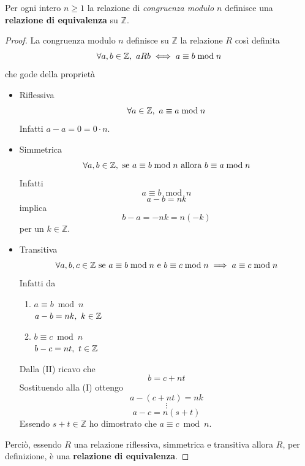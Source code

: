 \documentclass[a4paper,12pt, oneside]{book}
\begin{document}
\begin{teorema}
	Per ogni intero $n \geq 1$ la relazione di \textit{congruenza modulo $n$} definisce una \textbf{relazione di equivalenza} su $\mathbb{Z}$.

	\begin{proof}
		La congruenza modulo $n$ definisce su $\mathbb{Z}$ la relazione $R$ così definita
		$$\forall a,b \in \mathbb{Z}, \mbox{\space} aRb \iff a \equiv b \bmod n$$
		che gode della proprietà
		\begin{itemize}
			\item Riflessiva
			      $$\forall a \in \mathbb{Z}, \mbox{\space} a \equiv a \bmod n$$
			      Infatti $a-a=0=0 \cdot n$.
			\item Simmetrica
			      $$\forall a,b \in \mathbb{Z}, \mbox{\space se } a \equiv b \bmod n \mbox{ allora } b \equiv a \bmod n$$
			      Infatti
			      $$a \equiv b \bmod n$$ $$a-b=nk$$
			      implica
			      $$b-a=-nk = n(-k)$$
			      per un $k \in \mathbb{Z}$.
			\item Transitiva
			      $$\forall a,b,c \in \mathbb{Z} \mbox{\space se } a \equiv b \bmod n \mbox{ e } b \equiv c \bmod n \implies a \equiv c \bmod n$$
			      Infatti da \begin{enumerate}[label=\Roman*) ]
				      \item $a \equiv b \bmod n$\\
				            $a-b = nk, \mbox{\space} k \in \mathbb{Z}$
				      \item $b \equiv c \bmod n$\\
				            $b-c = nt, \mbox{\space} t \in \mathbb{Z}$
			      \end{enumerate}
			      Dalla (II) ricavo che
			      $$b = c+nt$$
			      Sostituendo alla (I) ottengo
			      $$a-(c+nt) = nk$$
			      $$\vdots$$
			      $$a-c = n(s+t)$$
			      Essendo $s+t \in \mathbb{Z}$ ho dimostrato che $a \equiv c \bmod n$.
		\end{itemize}
		Perciò, essendo $R$ una relazione riflessiva, simmetrica e transitiva allora $R$, per definizione, è una \textbf{relazione di equivalenza}.
	\end{proof}
\end{teorema}
\end{document}
